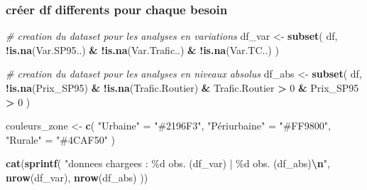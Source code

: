 \documentclass[
]{article}
\newenvironment{Shaded}{\begin{snugshade}}{\end{snugshade}}
\newcommand{\CommentTok}[1]{\textcolor[rgb]{0.56,0.35,0.01}{\textit{#1}}}
\newcommand{\DecValTok}[1]{\textcolor[rgb]{0.00,0.00,0.81}{#1}}
\newcommand{\FunctionTok}[1]{\textcolor[rgb]{0.13,0.29,0.53}{\textbf{#1}}}
\newcommand{\NormalTok}[1]{#1}
\newcommand{\OtherTok}[1]{\textcolor[rgb]{0.56,0.35,0.01}{#1}}
\newcommand{\SpecialCharTok}[1]{\textcolor[rgb]{0.81,0.36,0.00}{\textbf{#1}}}
\newcommand{\StringTok}[1]{\textcolor[rgb]{0.31,0.60,0.02}{#1}}
\begin{document}
\subsubsection{créer df differents pour chaque
besoin}\label{cruxe9er-df-differents-pour-chaque-besoin}

\begin{Shaded}
\begin{Highlighting}[]
\CommentTok{\# creation du dataset pour les analyses en variations}
\NormalTok{df\_var }\OtherTok{\textless{}{-}} \FunctionTok{subset}\NormalTok{(}
\NormalTok{  df,}
  \SpecialCharTok{!}\FunctionTok{is.na}\NormalTok{(Var.SP95..) }\SpecialCharTok{\&}
  \SpecialCharTok{!}\FunctionTok{is.na}\NormalTok{(Var.Trafic..) }\SpecialCharTok{\&}
  \SpecialCharTok{!}\FunctionTok{is.na}\NormalTok{(Var.TC..)}
\NormalTok{)}
\end{Highlighting}
\end{Shaded}

\begin{Shaded}
\begin{Highlighting}[]
\CommentTok{\# creation du dataset pour les analyses en niveaux absolus}
\NormalTok{df\_abs }\OtherTok{\textless{}{-}} \FunctionTok{subset}\NormalTok{(}
\NormalTok{  df,}
  \SpecialCharTok{!}\FunctionTok{is.na}\NormalTok{(Prix\_SP95) }\SpecialCharTok{\&}
  \SpecialCharTok{!}\FunctionTok{is.na}\NormalTok{(Trafic.Routier) }\SpecialCharTok{\&}
\NormalTok{  Trafic.Routier }\SpecialCharTok{\textgreater{}} \DecValTok{0} \SpecialCharTok{\&}
\NormalTok{  Prix\_SP95 }\SpecialCharTok{\textgreater{}} \DecValTok{0}
\NormalTok{)}
\end{Highlighting}
\end{Shaded}

\begin{Shaded}
\begin{Highlighting}[]
\NormalTok{couleurs\_zone }\OtherTok{\textless{}{-}} \FunctionTok{c}\NormalTok{(}
  \StringTok{"Urbaine"} \OtherTok{=} \StringTok{"\#2196F3"}\NormalTok{,}
  \StringTok{"Périurbaine"} \OtherTok{=} \StringTok{"\#FF9800"}\NormalTok{,}
  \StringTok{"Rurale"} \OtherTok{=} \StringTok{"\#4CAF50"}
\NormalTok{)}
\end{Highlighting}
\end{Shaded}

\begin{Shaded}
\begin{Highlighting}[]
\FunctionTok{cat}\NormalTok{(}\FunctionTok{sprintf}\NormalTok{(}
  \StringTok{"donnees chargees : \%d obs. (df\_var) | \%d obs. (df\_abs)}\SpecialCharTok{\textbackslash{}n}\StringTok{"}\NormalTok{,}
  \FunctionTok{nrow}\NormalTok{(df\_var),}
  \FunctionTok{nrow}\NormalTok{(df\_abs)}
\NormalTok{))}
\end{Highlighting}
\end{Shaded}
\end{document}
